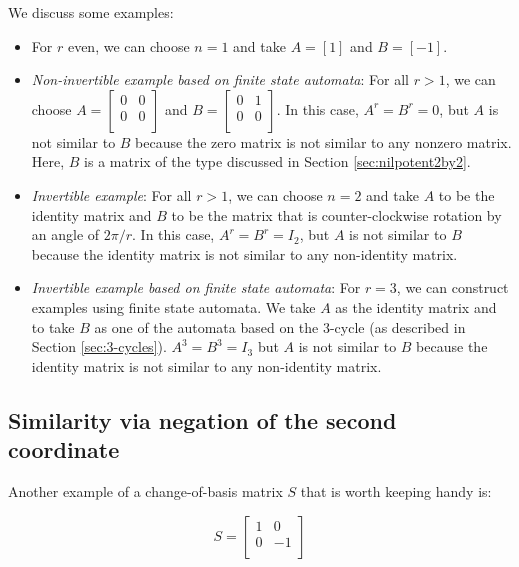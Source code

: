 \documentclass[10pt]{amsart}
\begin{document}
We discuss some examples:

\begin{itemize}
\item For $r$ even, we can choose $n = 1$ and take $A = [1]$ and $B =
  [-1]$.
\item {\em Non-invertible example based on finite state automata}: For
  all $r > 1$, we can choose $A = \left[\begin{matrix} 0 & 0 \\ 0 & 0
      \\\end{matrix}\right]$ and $B = \left[\begin{matrix} 0 & 1 \\ 0
      & 0 \\\end{matrix}\right]$. In this case, $A^r = B^r = 0$, but
  $A$ is not similar to $B$ because the zero matrix is not similar to
  any nonzero matrix. Here, $B$ is a matrix of the type discussed in
  Section \ref{sec:nilpotent2by2}.
\item {\em Invertible example}: For all $r > 1$, we can choose $n = 2$
  and take $A$ to be the identity matrix and $B$ to be the matrix that
  is counter-clockwise rotation by an angle of $2\pi/r$. In this case,
  $A^r = B^r = I_2$, but $A$ is not similar to $B$ because the
  identity matrix is not similar to any non-identity matrix.
\item {\em Invertible example based on finite state automata}: For $r
  = 3$, we can construct examples using finite state automata. We take
  $A$ as the identity matrix and to take $B$ as one of the automata
  based on the 3-cycle (as described in Section
  \ref{sec:3-cycles}). $A^3 = B^3 = I_3$ but $A$ is not similar to $B$
  because the identity matrix is not similar to any non-identity
  matrix.
\end{itemize}

\subsection{Similarity via negation of the second coordinate}

Another example of a change-of-basis matrix $S$ that is worth keeping
handy is:

$$S = \left[\begin{matrix} 1 & 0 \\ 0 & -1 \\\end{matrix}\right]$$
\end{document}
